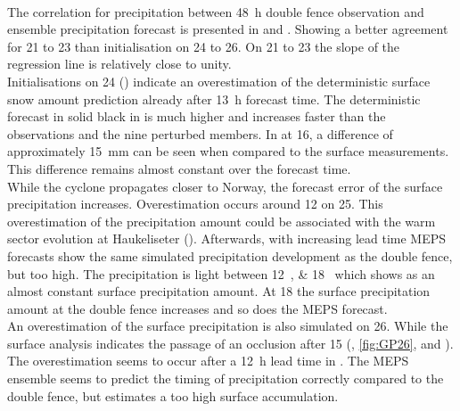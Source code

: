 \\
The correlation for precipitation between \SI{48}{\hour} double fence observation and ensemble precipitation forecast is presented in  and . Showing a better agreement for \num{21} to \SI{23}{\dec} than initialisation on \num{24} to \SI{26}{\dec}. On \num{21} to \SI{23}{\dec} the slope of the regression line is relatively close to unity. 
\\
Initialisations on \SI{24}{\dec} () indicate an overestimation of the deterministic surface snow amount prediction already after \SI{13}{\hour} forecast time. The deterministic forecast in solid black in  is much higher and increases faster than the observations and the nine perturbed members. In  at \SI{16}{\UTC}, a difference of approximately \SI{15}{\mm} can be seen when compared to the surface measurements. This difference remains almost constant over the forecast time. 
\\
While the cyclone propagates closer to Norway, the forecast error of the surface precipitation increases. Overestimation occurs around \SI{12}{\UTC} on \SI{25}{\dec}. This overestimation of the precipitation amount could be associated with the warm sector evolution at Haukeliseter (). Afterwards, with increasing lead time MEPS forecasts show the same simulated precipitation development as the double fence, but too high. The precipitation is light between \SIlist{12;18}{\UTC} which shows as an almost constant surface precipitation amount. At \SI{18}{\UTC} the surface precipitation amount at the double fence increases and so does the MEPS forecast.
\\
An overestimation of the surface precipitation is also simulated on \SI{26}{\dec}. While the surface analysis indicates the passage of an occlusion after \SI{15}{\UTC} (, \ref{fig:GP26}, and ). The overestimation seems to occur after a \SI{12}{\hour} lead time in . 
The MEPS ensemble seems to predict the timing of precipitation correctly compared to the double fence, but estimates a too high surface accumulation.
